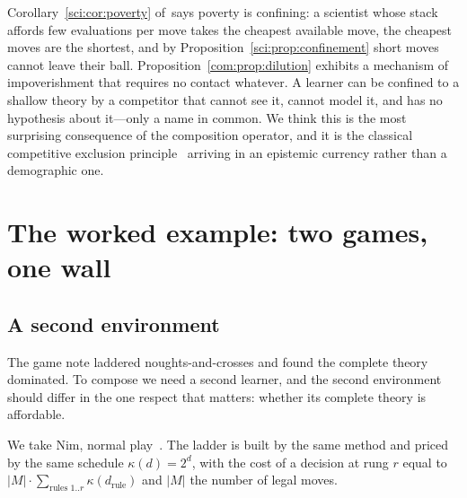 \begin{remark}\label{com:competition-mechanism-confinement}
Corollary~\ref{sci:cor:poverty} of~\chSci says poverty is confining: a scientist whose stack affords few
evaluations per move takes the cheapest available move, the cheapest moves are the shortest, and
by Proposition~\ref{sci:prop:confinement} short moves cannot leave their ball. Proposition~\ref{com:prop:dilution} exhibits
a mechanism of impoverishment that requires no contact whatever. A learner can be confined to a
shallow theory by a competitor that cannot see it, cannot model it, and has no hypothesis about
it---only a name in common. We think this is the most surprising consequence of the composition
operator, and it is the classical competitive exclusion principle~\cite{Hardin,Tilman} arriving
in an epistemic currency rather than a demographic one.
\end{remark}

\section{The worked example: two games, one wall}\label{com:sec:worked}\label{com:S11}

\subsection{A second environment}\label{com:S11.1}

The game note laddered noughts-and-crosses and found the complete theory dominated. To compose we
need a second learner, and the second environment should differ in the one respect that matters:
whether its complete theory is affordable.

We take Nim, normal play~\cite{Bouton}. The ladder is built by the same method and priced by the
same schedule $\kappa(d) = 2^d$, with the cost of a decision at rung $r$ equal to $|M| \cdot
\sum_{\text{rules } 1..r} \kappa(d_{\text{rule}})$ and $|M|$ the number of legal moves.

\begin{center}
\small
{}
\end{center}


